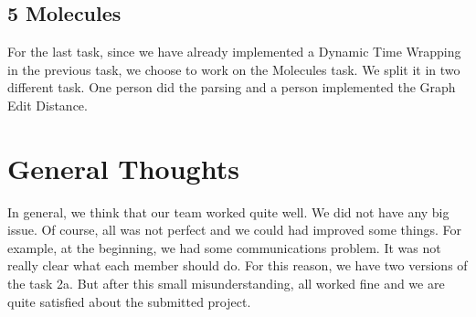\documentclass[12pt]{article}
\begin{document}
\subsection*{5 Molecules}
For the last task, since we have already implemented a Dynamic Time Wrapping in the previous task, we choose to work on the Molecules task. We split it in two different task. One person did the parsing and a person implemented the Graph Edit Distance. 

\section*{General Thoughts}
In general, we think that our team worked quite well. We did not have any big issue. Of course, all was not perfect and we could had improved some things. For example, at the beginning, we had some communications problem. It was not really clear what each member should do. For this reason, we have two versions of the task 2a. But after this small misunderstanding, all worked fine and we are quite satisfied about the submitted project.
\end{document}

